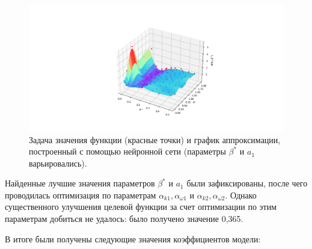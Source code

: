 \documentclass[mathematics,article,accept,pdftex,moreauthors]{Definitions/mdpi}
\begin{document}
\begin{figure}[H]
 
\includegraphics[width=0.6\linewidth]{NN_100_point_.pdf}
\caption{Задача значения функции (красные точки) и график аппроксимации, построенный с помощью нейронной сети (параметры $\beta^*$ и $a_1$ варьировались).\label{NN_100_point}}
 
\end{figure}   
 

Найденные лучшие значения параметров $\beta^*$ и $a_1$ были зафиксированы, после чего проводилась оптимизация по параметрам $\alpha_{k1}, \alpha_{\omega1}$ и $\alpha_{k2}, \alpha_{ \omega2}$.
Однако существенного улучшения целевой функции за счет оптимизации по этим параметрам добиться не удалось: было получено значение 0,365.


%
%

В итоге были получены следующие значения коэффициентов модели:
\end{document}
